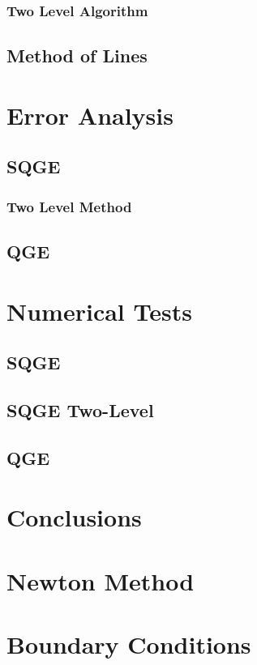 \documentclass{VTthesis}
\begin{document}
      \subsection{Two Level Algorithm} \label{sse:Algorithm}
      
    \section{Method of Lines} \label{sec:MoL}
    

  \chapter{Error Analysis} \label{ch:Errors}
    \section{SQGE} \label{sec:SQGEErrors}
    
      \subsection{Two Level Method} \label{sse:SQGE2LE}
      
    \section{QGE} \label{sec:QGEError}
    

  \chapter{Numerical Tests} \label{ch:Tests}
  \section{SQGE} \label{sec:SQGETests}
  
  \section{SQGE Two-Level} \label{sec:SQGE2LTests}
  
  \section{QGE} \label{sec:QGETests}
  

  \chapter{Conclusions} \label{ch:Conclusions}
  

  
  

  \appendix
  \chapter{Newton Method} \label{sec:Newton}
  
  \chapter{Boundary Conditions} \label{sse:BCs}
  
\end{document}

